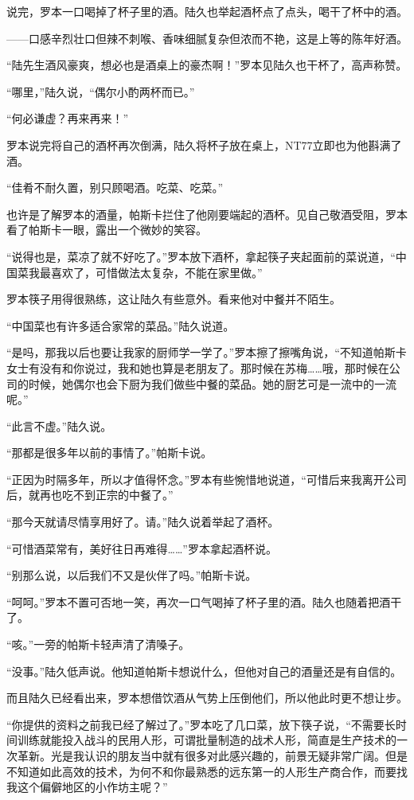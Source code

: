 说完，罗本一口喝掉了杯子里的酒。陆久也举起酒杯点了点头，喝干了杯中的酒。

——口感辛烈壮口但辣不刺喉、香味细腻复杂但浓而不艳，这是上等的陈年好酒。

“陆先生酒风豪爽，想必也是酒桌上的豪杰啊！”罗本见陆久也干杯了，高声称赞。

“哪里，”陆久说，“偶尔小酌两杯而已。”

“何必谦虚？再来再来！”

罗本说完将自己的酒杯再次倒满，陆久将杯子放在桌上，NT77立即也为他斟满了酒。

“佳肴不耐久置，别只顾喝酒。吃菜、吃菜。”

也许是了解罗本的酒量，帕斯卡拦住了他刚要端起的酒杯。见自己敬酒受阻，罗本看了帕斯卡一眼，露出一个微妙的笑容。

“说得也是，菜凉了就不好吃了。”罗本放下酒杯，拿起筷子夹起面前的菜说道，“中国菜我最喜欢了，可惜做法太复杂，不能在家里做。”

罗本筷子用得很熟练，这让陆久有些意外。看来他对中餐并不陌生。

“中国菜也有许多适合家常的菜品。”陆久说道。

“是吗，那我以后也要让我家的厨师学一学了。”罗本擦了擦嘴角说，“不知道帕斯卡女士有没有和你说过，我和她也算是老朋友了。那时候在苏梅……哦，那时候在公司的时候，她偶尔也会下厨为我们做些中餐的菜品。她的厨艺可是一流中的一流呢。”

“此言不虚。”陆久说。

“那都是很多年以前的事情了。”帕斯卡说。

“正因为时隔多年，所以才值得怀念。”罗本有些惋惜地说道，“可惜后来我离开公司后，就再也吃不到正宗的中餐了。”

“那今天就请尽情享用好了。请。”陆久说着举起了酒杯。

“可惜酒菜常有，美好往日再难得……”罗本拿起酒杯说。

“别那么说，以后我们不又是伙伴了吗。”帕斯卡说。

“呵呵。”罗本不置可否地一笑，再次一口气喝掉了杯子里的酒。陆久也随着把酒干了。

“咳。”一旁的帕斯卡轻声清了清嗓子。

“没事。”陆久低声说。他知道帕斯卡想说什么，但他对自己的酒量还是有自信的。

而且陆久已经看出来，罗本想借饮酒从气势上压倒他们，所以他此时更不想让步。

“你提供的资料之前我已经了解过了。”罗本吃了几口菜，放下筷子说，“不需要长时间训练就能投入战斗的民用人形，可谓批量制造的战术人形，简直是生产技术的一次革新。光是我认识的朋友当中就有很多对此感兴趣的，前景无疑非常广阔。但是不知道如此高效的技术，为何不和你最熟悉的远东第一的人形生产商合作，而要找我这个偏僻地区的小作坊主呢？”

